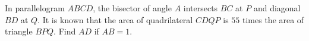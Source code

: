 In parallelogram $ABCD$, the bisector of angle $A$ intersects $BC$ at $P$ and diagonal $BD$ at $Q$. It is known that the area of quadrilateral $CDQP$ is $55$ times the area of triangle $BPQ$. Find $AD$ if $AB=1$.
